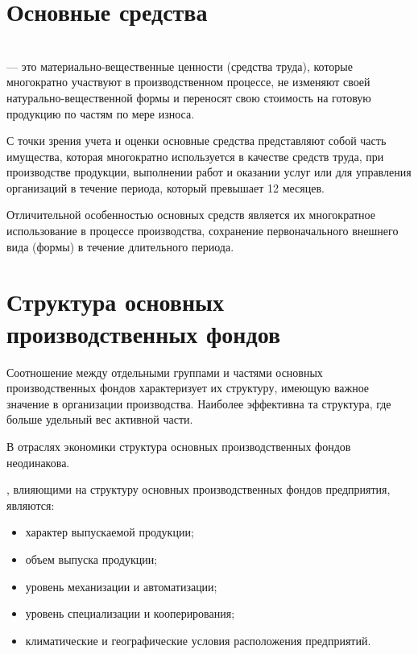 \section{Основные средства}

\begin{definition}
    \normalfont
    ~\\
     --- это материально-вещественные ценности (средства
    труда), которые многократно участвуют в производственном процессе, не
    изменяют своей натурально-вещественной формы и переносят свою стоимость на
    готовую продукцию по частям по мере износа.
\end{definition}

С точки зрения учета и оценки основные средства представляют собой часть
имущества, которая многократно используется в качестве средств труда, при
производстве продукции, выполнении работ и оказании услуг или для управления
организаций в течение периода, который превышает 12 месяцев.

Отличительной особенностью основных средств является их многократное
использование в процессе производства, сохранение первоначального внешнего вида
(формы) в течение длительного периода.

\section{Структура основных производственных фондов}

Соотношение между отдельными группами и частями основных производственных фондов
характеризует их структуру, имеющую важное значение в организации производства.
Наиболее эффективна та структура, где больше удельный вес активной части.

В отраслях экономики структура основных производственных фондов неодинакова.

, влияющими на структуру основных производственных
фондов предприятия, являются:

\begin{itemize}
	\item характер выпускаемой продукции;
	\item объем выпуска продукции;
	\item уровень механизации и автоматизации;
	\item уровень специализации и кооперирования;
	\item климатические и географические условия расположения предприятий.
\end{itemize}

